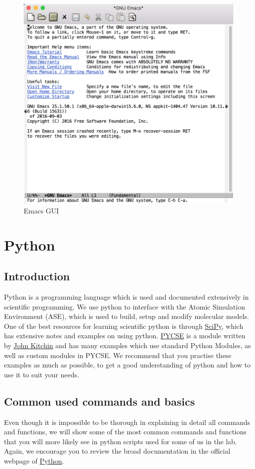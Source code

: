 \documentclass[11pt]{article}
\begin{document}
\begin{enumerate}
\begin{figure}[htb]
\centering
\includegraphics[width=.9\linewidth]{./figures/emacs.png}
\caption{Emacs GUI}
\end{figure}
\end{enumerate}

\section{Python}
\label{sec-4}
\subsection{Introduction}
\label{sec-4-1}
Python is a programming language which is used and documented extensively in scientific programming. We use python to interface with the Atomic Simulation Environment (ASE), which is used to build, setup and modify molecular models.
One of the best resources for learning scientific python is through \href{http://www.scipy-lectures.org/}{SciPy}, which has extensive notes and examples on using python. \href{http://kitchingroup.cheme.cmu.edu/pycse/pycse.html}{PYCSE} is a module written by \href{http://kitchingroup.cheme.cmu.edu/}{John Kitchin} and has many examples which use standard Python Modules, as well as custom modules in PYCSE. We recommend that you practise these examples as much as possible, to get a good understanding of python and how to use it to suit your needs. 
\subsection{Common used commands and basics}
\label{sec-4-2}
Even though it is impossible to be thorough in explaining in detail all commands and functions, we will show some of the most common commands and functions that you will more likely see in python scripts used for some of us in the lab. Again, we encourage you to review the broad documentation in the official webpage of \href{https://docs.python.org/2/}{Python}. 
\end{document}

